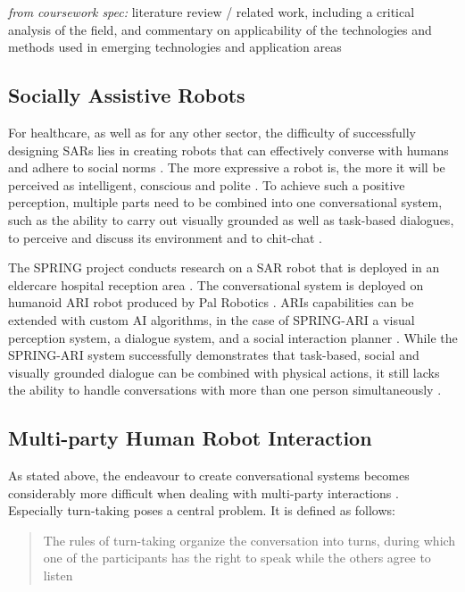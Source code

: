 \documentclass[hidelinks, 11pt]{article}
\begin{document}
\textit{from coursework spec:} literature review / related work, including a critical analysis of the field, and commentary on applicability of the technologies and methods used in emerging technologies and application areas

\subsection{Socially Assistive Robots}
\label{subsec:socially_assistive_robots}
For healthcare, as well as for any other sector, the difficulty of successfully designing SARs lies in creating robots that can effectively converse with humans and adhere to social norms \cite{moujahid_multi_party_2022}. The more expressive a robot is, the more it will be perceived as intelligent, conscious and polite \cite{moujahid_multi_party_2022}. To achieve such a positive perception, multiple parts need to be combined into one conversational system, such as the ability to carry out visually grounded as well as task-based dialogues, to perceive and discuss its environment and to chit-chat \cite{gunson_visually_aware_2022}.

The SPRING project conducts research on a SAR robot that is deployed in an eldercare hospital reception area \cite{addlesee_comprehensive_2020}. The conversational system is deployed on humanoid ARI robot produced by Pal Robotics \cite{palrobot}. ARIs capabilities can be extended with custom AI algorithms, in the case of SPRING-ARI a visual perception system, a dialogue system, and a social interaction planner \cite{addlesee_comprehensive_2020}. While the SPRING-ARI system successfully demonstrates that task-based, social and visually grounded dialogue can be combined with physical actions, it still lacks the ability to handle conversations with more than one person simultaneously \cite{addlesee_comprehensive_2020}.

\subsection{Multi-party Human Robot Interaction}
\label{subsec:multi_party}
As stated above, the endeavour to create conversational systems becomes considerably more difficult when dealing with multi-party interactions \cite{Group_1_unpublished_paper}. Especially turn-taking poses a central problem. It is defined as follows:

\begin{quote}
  The rules of turn-taking organize the conversation into turns, during which one of the participants has the right to speak while the others agree to listen \cite{Żarkowski_2019}
\end{quote}
\end{document}
